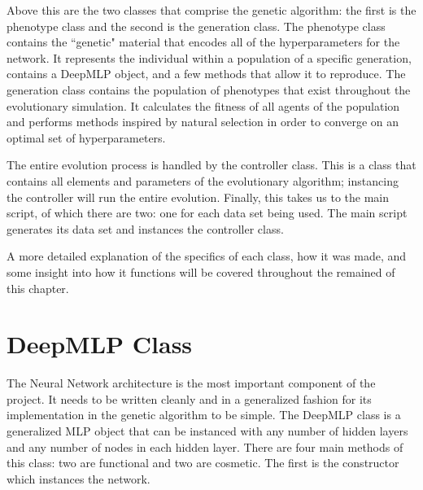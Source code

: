\documentclass[12pt]{report}
\begin{document}
Above this are the two classes that comprise the genetic algorithm: the first is the phenotype class and the second is the generation class.
The phenotype class contains the ``genetic" material that encodes all of the hyperparameters for the network.
It represents the individual within a population of a specific generation, contains a DeepMLP object, and a few methods that allow it to reproduce.
The generation class contains the population of phenotypes that exist throughout the evolutionary simulation. It calculates the fitness of all agents of the population and performs methods inspired by natural selection in order to converge on an optimal set of hyperparameters.

The entire evolution process is handled by the controller class.
This is a class that contains all elements and parameters of the evolutionary algorithm; instancing the controller will run the entire evolution. 
Finally, this takes us to the main script, of which there are two: one for each data set being used.
The main script generates its data set and instances the controller class.

A more detailed explanation of the specifics of each class, how it was made, and some insight into how it functions will be covered throughout the remained of this chapter.

\section{DeepMLP Class}
The Neural Network architecture is the most important component of the project. It needs to be written cleanly and in a generalized fashion for its implementation in the genetic algorithm to be simple. The DeepMLP class is a generalized MLP object that can be instanced with any number of hidden layers and any number of nodes in each hidden layer. There are four main methods of this class: two are functional and two are cosmetic. The first is the constructor which instances the network.


\end{document}
